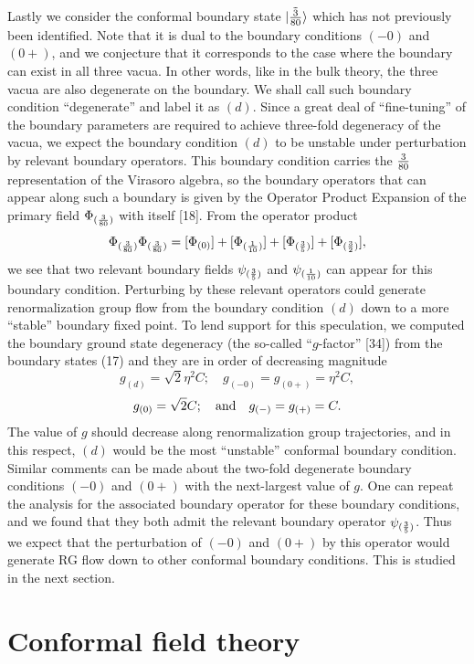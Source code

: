\documentclass[12pt]{article}
\begin{document}
Lastly we consider the conformal boundary state $|\tilde{3\over80}\rangle$ which
has not previously been identified. Note that it is dual to the boundary
conditions $(-0)$ and $(0+)$, and we conjecture that it corresponds to the
case where the boundary can exist in all three vacua. In other words, like
in the bulk theory, the three vacua are also degenerate on the boundary. We
shall call such boundary condition ``degenerate'' and label it as $(d)$.
Since a great deal of ``fine-tuning'' of the boundary parameters are required
to achieve three-fold degeneracy of the vacua, we expect the boundary
condition $(d)$ to be unstable under perturbation by relevant boundary
operators. This boundary condition carries the $3\over{80}$ representation of
the Virasoro algebra, so the boundary operators that can appear along such
a boundary is given by the Operator Product Expansion of the primary field
$\Phi_{({3\over{80}})}$ with itself [18]. From the operator product
$$\Phi_{({3\over{80}})}\Phi_{({3\over{80}})} = [\Phi_{(0)}] +
[\Phi_{({1\over{10}})}] + [\Phi_{({3\over5})}] + [\Phi_{({3\over2})}],$$
we see that two relevant boundary fields $\psi_{({3\over5})}$ and
$\psi_{({1\over{10}})}$ can appear for this boundary condition. Perturbing by
these relevant operators could generate renormalization group flow from the
boundary condition $(d)$ down to a more ``stable'' boundary fixed point.
To lend support for this speculation, we computed the boundary ground state
degeneracy (the so-called ``$g$-factor'' [34])
from the boundary states (17) and
they are in order of decreasing magnitude
$$g_{(d)} = \sqrt{2}\eta^2C; \quad g_{(-0)} = g_{(0+)} = \eta^2C,$$
$$g_{(0)} = \sqrt{2}C; \quad \hbox{and} \quad g_{(-)} = g_{(+)} = C.$$
The value of $g$ should decrease along renormalization group trajectories,
and in this respect, $(d)$ would be the most ``unstable'' conformal boundary
condition. Similar comments can be made about the two-fold degenerate
boundary conditions $(-0)$ and $(0+)$ with the next-largest value of $g$.
One can repeat the analysis for the associated boundary operator for these
boundary conditions, and we found that they both admit the relevant boundary
operator $\psi_{({3\over5})}$. Thus we expect that the perturbation of
$(-0)$ and $(0+)$ by this operator would
generate RG flow down to other conformal boundary conditions. This is studied
in the next section.


\section{Conformal field theory}
\label{sec:conf-field-theory}
\end{document}
